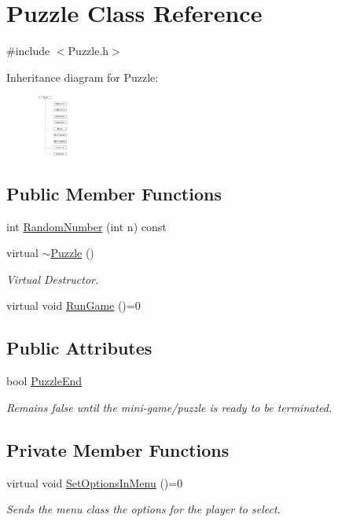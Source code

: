 \hypertarget{classPuzzle}{\section{Puzzle Class Reference}
\label{classPuzzle}
}


{\ttfamily \#include $<$Puzzle.\-h$>$}

Inheritance diagram for Puzzle\-:\begin{figure}[H]
\begin{center}
\leavevmode
\includegraphics[height=2.000000cm]{classPuzzle}
\end{center}
\end{figure}
\subsection*{Public Member Functions}
\begin{DoxyCompactItemize}
\item 
int \hyperlink{classPuzzle_ad0be5c887460d0b386bf5d97264f0c24}{Random\-Number} (int n) const 
\item 
virtual \hyperlink{classPuzzle_a4319df1536a07cd1aaf23b27aeb53579}{$\sim$\-Puzzle} ()
\begin{DoxyCompactList}\small\item\em Virtual Destructor. \end{DoxyCompactList}\item 
virtual void \hyperlink{classPuzzle_ac92d0a3389cc806c0334aa224b72fa78}{Run\-Game} ()=0
\end{DoxyCompactItemize}
\subsection*{Public Attributes}
\begin{DoxyCompactItemize}
\item 
bool \hyperlink{classPuzzle_a965ad54e9f7340c3cad944fc82c61a2b}{Puzzle\-End}
\begin{DoxyCompactList}\small\item\em Remains false until the mini-\/game/puzzle is ready to be terminated. \end{DoxyCompactList}\end{DoxyCompactItemize}
\subsection*{Private Member Functions}
\begin{DoxyCompactItemize}
\item 
virtual void \hyperlink{classPuzzle_adc90364342151caf536c4a34f2ca71d3}{Set\-Options\-In\-Menu} ()=0
\begin{DoxyCompactList}\small\item\em Sends the menu class the options for the player to select. \end{DoxyCompactList}\end{DoxyCompactItemize}


